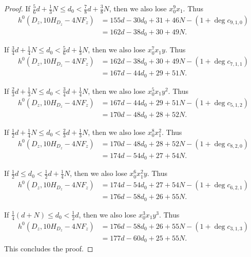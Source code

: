 \documentclass[10pt,a4paper]{amsart}
\begin{document}
\begin{proof}
	If $\frac56d + \frac13 N \le d_0 < \frac78d + \frac38 N$, then we also lose $x_0^9x_1$. Thus
	\begin{align*}
		h^0(D_z, 10H_{D_z} - 4NF_z) & = 155d - 30d_0 + 31 + 46N - (1 + \deg c_{9, 1, 0}) \\
		& = 162d - 38d_0 + 30 + 49N.
	\end{align*}
	
	If $\frac34d + \frac14 N \le d_0 < \frac56d + \frac13 N$, then we also lose $x_0^7x_1y$. Thus
	\begin{align*}
		h^0(D_z, 10H_{D_z} - 4NF_z) & = 162d - 38d_0 + 30 + 49N - (1 + \deg c_{7, 1, 1}) \\
		& = 167d - 44d_0 + 29 + 51N.
	\end{align*}
	
	If $\frac23d + \frac13 N \le d_0 < \frac34d + \frac14 N$, then we also lose $x_0^5x_1y^2$. Thus
	\begin{align*}
		h^0(D_z, 10H_{D_z} - 4NF_z) & = 167d - 44d_0 + 29 + 51N - (1 + \deg c_{5, 1, 2}) \\
		& = 170d - 48d_0 + 28 + 52N.
	\end{align*}
	
	If $\frac12d + \frac14 N \le d_0 < \frac23d + \frac13 N$, then we also lose $x_0^8x_1^2$. Thus
	\begin{align*}
		h^0(D_z, 10H_{D_z} - 4NF_z) & = 170d - 48d_0 + 28 + 52N - (1 + \deg c_{8, 2, 0}) \\
		& = 174d - 54d_0 + 27 + 54N.
	\end{align*}
	
	If $\frac12d \le d_0 < \frac12d + \frac14 N$, then we also lose $x_0^6x_1^2y$. Thus
	\begin{align*}
		h^0(D_z, 10H_{D_z} - 4NF_z) & = 174d - 54d_0 + 27 + 54N - (1 + \deg c_{6, 2, 1}) \\
		& = 176d - 58d_0 + 26 + 55N.
	\end{align*}
	
	If $\frac14(d + N) \le d_0 < \frac12d$, then we also lose $x_0^3x_1y^3$. Thus
	\begin{align*}
		h^0(D_z, 10H_{D_z} - 4NF_z) & = 176d - 58d_0 + 26 + 55N - (1 + \deg c_{3, 1, 3}) \\
		& = 177d - 60d_0 + 25 + 55N.
	\end{align*}
	This concludes the proof.
\end{proof}
\end{document}

